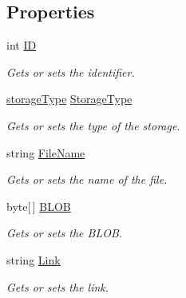 \subsection*{Properties}
\begin{DoxyCompactItemize}
\item 
int \hyperlink{class_open_1_1_g_i_1_1hypermart_1_1_models_1_1_file_ade215e549b777e8f30cfa19ec28cff96}{I\+D}
\begin{DoxyCompactList}\small\item\em Gets or sets the identifier. \end{DoxyCompactList}\item 
\hyperlink{namespace_open_1_1_g_i_1_1hypermart_1_1_models_a21c5ffa7da75ad8a6d2b04798113f9db}{storage\+Type} \hyperlink{class_open_1_1_g_i_1_1hypermart_1_1_models_1_1_file_a4d6910e1f3277beb5b50309e8139a356}{Storage\+Type}
\begin{DoxyCompactList}\small\item\em Gets or sets the type of the storage. \end{DoxyCompactList}\item 
string \hyperlink{class_open_1_1_g_i_1_1hypermart_1_1_models_1_1_file_a5675dd150dd5ca0de9bc6755fe6c45ad}{File\+Name}
\begin{DoxyCompactList}\small\item\em Gets or sets the name of the file. \end{DoxyCompactList}\item 
byte\mbox{[}$\,$\mbox{]} \hyperlink{class_open_1_1_g_i_1_1hypermart_1_1_models_1_1_file_acfdfc6e64338fc14a71994e5d7aa5111}{B\+L\+O\+B}
\begin{DoxyCompactList}\small\item\em Gets or sets the B\+L\+O\+B. \end{DoxyCompactList}\item 
string \hyperlink{class_open_1_1_g_i_1_1hypermart_1_1_models_1_1_file_a47b36d33252b1a1f58bee02a94d11dd5}{Link}
\begin{DoxyCompactList}\small\item\em Gets or sets the link. \end{DoxyCompactList}\item 

\end{DoxyCompactItemize}
